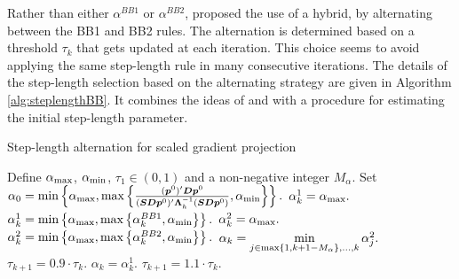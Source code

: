 \documentclass[11pt]{article}
\newcommand{\0}{\phantom{0}}
\newcommand*{\minidx}{\operatornamewithlimits{min}\limits}
\begin{document}
Rather than either $\alpha^{BB1}$ or $\alpha^{BB2}$, \citet{Bonettini2009} proposed the use of a hybrid, by alternating between the BB1 and BB2 rules. The alternation is determined based on a threshold $\tau_{k}$ that gets updated at each iteration. This choice seems to avoid applying the same step-length rule in many consecutive iterations. The details of the step-length selection based on the alternating strategy are given in Algorithm \ref{alg:steplengthBB}. It combines the ideas of \citet{Bonettini2009} and \citet{Bertero2013} with a procedure for estimating the initial step-length parameter. 

\begin{algorithm}
	\caption{Step-length alternation for scaled gradient projection}
	\label{alg:steplengthBB}
	\begin{spacing}{1.3}
		\begin{algorithmic}
			\State Define $\alpha_{\tiny \textnormal{max}}$, $\alpha_{\tiny \textnormal{min}}$, $\tau_{1} \in (0, 1)$ and a non-negative integer $M_{\alpha}$. 
			\State Set $\alpha_{0} = \textnormal{min}\left\{\alpha_{\tiny \textnormal{max}}, \textnormal{max}\left\{\frac{(\bm{p}^{0})'\bm{D}\bm{p}^{0}}{(\bm{S}\bm{D}\bm{p}^{0})'\bm{\Lambda}_{h}^{-1}(\bm{S}\bm{D}\bm{p}^{0})}, \alpha_{\tiny \textnormal{min}}\right\}\right\}.$ 
			\Else {}
			\State $\alpha^{1}_{k} = \alpha_{\textnormal{max}}.$
			\Else {}
			\State $\alpha_{k}^{1} = \textnormal{min}\left\{\alpha_{\tiny \textnormal{max}}, \textnormal{max}\left\{\alpha^{BB1}_{k}, \alpha_{\tiny \textnormal{min}}\right\}\right\}.$
			\EndIf
			\State $\alpha^{2}_{k} = \alpha_{\textnormal{max}}.$
			\Else {}
			\State $\alpha_{k}^{2} = \textnormal{min}\left\{\alpha_{\tiny \textnormal{max}}, \textnormal{max}\left\{\alpha^{BB2}_{k}, \alpha_{\tiny \textnormal{min}}\right\}\right\}.$
			\EndIf
			\State $\alpha_{k} = \minidx\limits_{j \in \textnormal{max}\left\{1, k + 1 - M_{\alpha}\right\}, \dots, k}\alpha^{2}_{j}.$ \vspace*{1.5mm}
			\State $\tau_{k+1} = 0.9 \cdot \tau_{k}.$
			\Else {}
			\State $\alpha_{k} = \alpha^{1}_{k}.$
			\State $\tau_{k+1} = 1.1 \cdot \tau_{k}.$
			\EndIf
			\EndIf
		\end{algorithmic}
	\end{spacing}
\end{algorithm}
\end{document}
